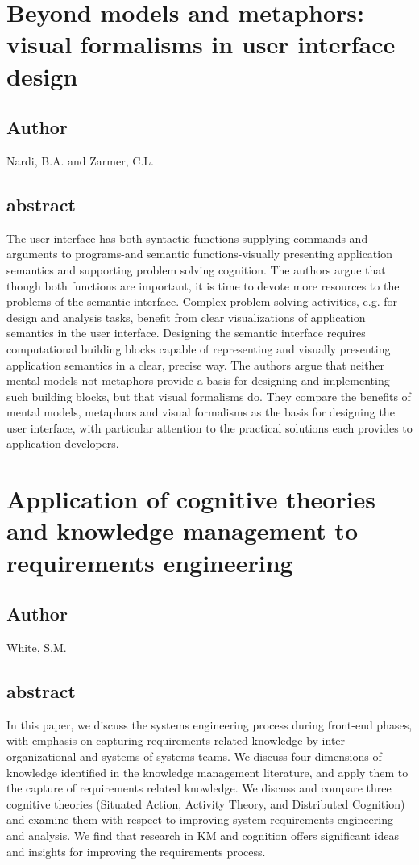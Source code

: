\documentclass[lnbip,sechang,a4paper]{svmultln}
\begin{document}
\section{Beyond models and metaphors: visual formalisms in user interface
design} 
\subsection{Author}
Nardi, B.A. and Zarmer, C.L.
\subsection{abstract}
The user interface has both syntactic functions-supplying commands and arguments
to programs-and semantic functions-visually presenting application semantics and
supporting problem solving cognition. The authors argue that though both functions are important, it is time to devote more resources to the problems of the semantic interface. Complex problem solving activities, e.g. for design and analysis tasks, benefit from clear visualizations of application semantics in the user interface. Designing the semantic interface requires computational building blocks capable of representing and visually presenting application semantics in a clear, precise way. The authors argue that neither mental models not metaphors provide a basis for designing and implementing such building blocks, but that visual formalisms do. They compare the benefits of mental models, metaphors and visual formalisms as the basis for designing the user interface, with particular attention to the practical solutions each provides to application developers.
\cite{184010}
\section{Application of cognitive theories and knowledge management to
requirements engineering}
\subsection{Author}
White, S.M.
\subsection{abstract}
In this paper, we discuss the systems engineering process during front-end
phases, with emphasis on capturing requirements related knowledge by inter-organizational and systems of systems teams. We discuss four dimensions of knowledge identified in the knowledge management literature, and apply them to the capture of requirements related knowledge. We discuss and compare three cognitive theories (Situated Action, Activity Theory, and Distributed Cognition) and examine them with respect to improving system requirements engineering and analysis. We find that research in KM and cognition offers significant ideas and insights for improving the requirements process.
\cite{5482489}
\end{document}
